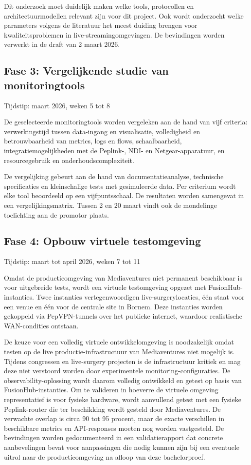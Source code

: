 Dit onderzoek moet duidelijk maken welke tools, protocollen en architectuurmodellen relevant zijn voor dit project. Ook wordt onderzocht welke parameters volgens de literatuur het meest duiding brengen voor kwaliteitsproblemen in live-streamingomgevingen. De bevindingen worden verwerkt in de draft van 2 maart 2026.

\subsection{Fase 3: Vergelijkende studie van monitoringtools}

Tijdstip: maart 2026, weken 5 tot 8

De geselecteerde monitoringtools worden vergeleken aan de hand van vijf criteria: verwerkingstijd tussen data-ingang en visualisatie, volledigheid en betrouwbaarheid van metrics, logs en flows, schaalbaarheid, integratiemogelijkheden met de Peplink-, NDI- en Netgear-apparatuur, en resourcegebruik en onderhoudscomplexiteit.

De vergelijking gebeurt aan de hand van documentatieanalyse, technische specificaties en kleinschalige tests met gesimuleerde data. Per criterium wordt elke tool beoordeeld op een vijfpuntsschaal. De resultaten worden samengevat in een vergelijkingsmatrix. Tussen 2 en 20 maart vindt ook de mondelinge toelichting aan de promotor plaats.

\subsection{Fase 4: Opbouw virtuele testomgeving}

Tijdstip: maart tot april 2026, weken 7 tot 11

Omdat de productieomgeving van Mediaventures niet permanent beschikbaar is voor uitgebreide tests, wordt een virtuele testomgeving opgezet met FusionHub-instanties. Twee instanties vertegenwoordigen live-surgerylocaties, één staat voor een venue en één voor de centrale site in Bornem. Deze instanties worden gekoppeld via PepVPN-tunnels over het publieke internet, waardoor realistische WAN-condities ontstaan.

De keuze voor een volledig virtuele ontwikkelomgeving is noodzakelijk omdat testen op de live productie-infrastructuur van Mediaventures niet mogelijk is. Tijdens congressen en live-surgery projecten is de infrastructuur kritiek en mag deze niet verstoord worden door experimentele monitoring-configuraties. De observability-oplossing wordt daarom volledig ontwikkeld en getest op basis van FusionHub-instanties.
Om te valideren in hoeverre de virtuele omgeving representatief is voor fysieke hardware, wordt aanvullend getest met een fysieke Peplink-router die ter beschikking wordt gesteld door Mediaventures. De verwachte overlap is circa 90 tot 95 procent, maar de exacte verschillen in beschikbare metrics en API-responses moeten nog worden vastgesteld. De bevindingen worden gedocumenteerd in een validatierapport dat concrete aanbevelingen bevat voor aanpassingen die nodig kunnen zijn bij een eventuele uitrol naar de productieomgeving na afloop van deze bachelorproef.

